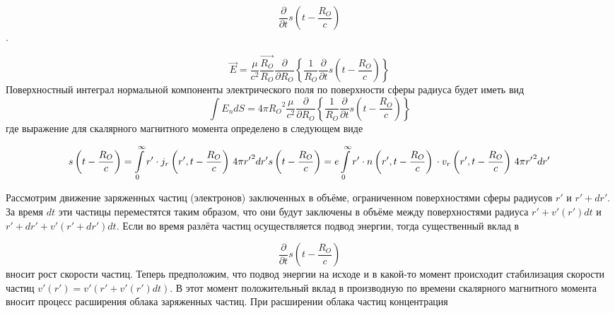 \documentclass[11pt]{article}
\begin{document}
\begin{equation}
\frac{\partial }{\partial t}s\left( t-\frac{{{R}_{O}}}{c} \right)
\end{equation}.

\begin{equation}
\overrightarrow{E}=\frac{\mu }{{{c}^{2}}}\frac{\overrightarrow{{{R}_{O}}}}{{{R}_{O}}}\frac{\partial }{\partial {{R}_{O}}}\left\{
\frac{1}{{{R}_{O}}}\frac{\partial }{\partial t}s\left(
t-\frac{{{R}_{O}}}{c} \right) \right\}
\end{equation}
Поверхностный интеграл
нормальной компоненты электрического поля по поверхности сферы радиуса
будет иметь вид
\begin{equation}
\int{{{E}_{n}}dS=4\pi {{R}_{O}}^{2}}\frac{\mu }{{{c}^{2}}}\frac{\partial }{\partial {{R}_{O}}}\left\{
\frac{1}{{{R}_{O}}}\frac{\partial }{\partial t}s\left(
t-\frac{{{R}_{O}}}{c} \right) \right\}
\end{equation}
где выражение для скалярного
магнитного момента определено в следующем виде

\begin{equation}
s \left(t-\frac{{R}_{O}}{c}\right)
=
\int\limits_{0}^{\infty }
r'\cdot {{j}_{r}}\left( r',t-\frac{{R}_{O}}{c} \right)
\, 4\pi r{{'}^{2}}dr' \\
s\left( t-\frac{{{R}_{O}}}{c} \right)
=
e\int\limits_{0}^{\infty }{r'\cdot n\left( r',t-\frac{{{R}_{O}}}{c} \right)}\,
\cdot {{v}_{r}}\left(r',t-\frac{{{R}_{O}}}{c} \right)
\,4\pi r{{'}^{2}}dr' \\
\end{equation}



 Рассмотрим движение заряженных частиц (электронов) заключенных в
объёме, ограниченном поверхностями сферы радиусов \(r'\) и \(r'+dr'\).
За время \(dt\) эти частицы переместятся таким образом, что они будут
заключены в объёме между поверхностями радиуса
\(r'+v'\left( r' \right)dt\) и \(r'+dr'+v'\left( r'+dr' \right)dt\).
Если во время разлёта частиц осуществляется подвод энергии, тогда
существенный вклад в

 \begin{equation}\frac{\partial }{\partial t}s\left(
t-\frac{{{R}_{O}}}{c} \right)\end{equation} вносит рост скорости частиц. Теперь
предположим, что подвод энергии на исходе и в какой-то момент происходит
стабилизация скорости частиц
\(v'\left( r' \right)=v'\left( r'+v'\left( r' \right)dt \right)\). В
этот момент положительный вклад в производную по времени скалярного
магнитного момента вносит процесс расширения облака заряженных частиц.
При расширении облака частиц концентрация
\end{document}

